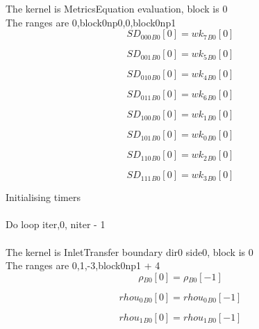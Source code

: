 \documentclass{article}
\begin{document}
\noindent The kernel is MetricsEquation evaluation, block is 0\\\noindent The ranges are 0,block0np0,0,block0np1\\\begin{dmath}{SD_{000}{_{B0}}}[{0}] = {wk_{7}{_{B0}}}[{0}]\end{dmath}

\begin{dmath}{SD_{001}{_{B0}}}[{0}] = {wk_{5}{_{B0}}}[{0}]\end{dmath}

\begin{dmath}{SD_{010}{_{B0}}}[{0}] = {wk_{4}{_{B0}}}[{0}]\end{dmath}

\begin{dmath}{SD_{011}{_{B0}}}[{0}] = {wk_{6}{_{B0}}}[{0}]\end{dmath}

\begin{dmath}{SD_{100}{_{B0}}}[{0}] = {wk_{1}{_{B0}}}[{0}]\end{dmath}

\begin{dmath}{SD_{101}{_{B0}}}[{0}] = {wk_{0}{_{B0}}}[{0}]\end{dmath}

\begin{dmath}{SD_{110}{_{B0}}}[{0}] = {wk_{2}{_{B0}}}[{0}]\end{dmath}

\begin{dmath}{SD_{111}{_{B0}}}[{0}] = {wk_{3}{_{B0}}}[{0}]\end{dmath}

\noindent Initialising timers\\
\\\noindent Do loop iter,0, niter - 1\\
\\\noindent The kernel is InletTransfer boundary dir0 side0, block is 0\\\noindent The ranges are 0,1,-3,block0np1 + 4\\\begin{dmath}{\rho{_{B0}}}[{0}] = {\rho{_{B0}}}[{-1}]\end{dmath}

\begin{dmath}{rhou_{0}{_{B0}}}[{0}] = {rhou_{0}{_{B0}}}[{-1}]\end{dmath}

\begin{dmath}{rhou_{1}{_{B0}}}[{0}] = {rhou_{1}{_{B0}}}[{-1}]\end{dmath}
\end{document}
